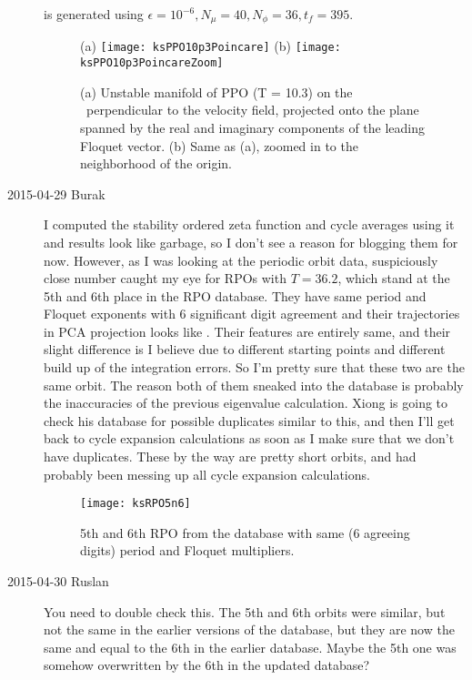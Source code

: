 \begin{description}
 is generated using
$\epsilon = 10^{-6}, N_\mu = 40, N_\phi = 36, t_f = 395$.


\begin{figure}[ht]
\begin{center}
    (a) \texttt{[image: ksPPO10p3Poincare]}
    (b) \texttt{[image: ksPPO10p3PoincareZoom]}
\end{center}
    \caption[]{
        (a) Unstable manifold of PPO (T = 10.3) on the \PoincSec\
        perpendicular to the velocity field, projected onto the plane
        spanned by the real and imaginary components of the leading Floquet
        vector. (b) Same as (a), zoomed in to the neighborhood of the origin.
    }
    \label{f-ppo10p3UnstMan}
\end{figure}

\item[2015-04-29 Burak] I computed the stability ordered zeta function
and cycle averages using it and results look like garbage, so I don't
see a reason for blogging them for now. However, as I was looking at
the periodic orbit data, suspiciously close number caught my eye for
RPOs with $T=36.2$, which stand at the 5th and 6th place in the RPO
database. They have same period and Floquet exponents with 6 significant
digit agreement and their trajectories in PCA projection looks like
\reffig{f-ksRPO5n6}. Their features are entirely same, and their slight
difference is I believe due to different starting points and different
build up of the integration errors. So I'm pretty sure that these two
are the same orbit. The reason both of them sneaked into the database
is probably the inaccuracies of the previous eigenvalue calculation.
Xiong is going to check his database for possible duplicates similar to
this, and then I'll get back to cycle expansion calculations as soon as
I make sure that we don't have duplicates. These by the way are pretty
short orbits, and had probably been messing up all cycle expansion
calculations.

\begin{figure}[ht]
\begin{center}
    \texttt{[image: ksRPO5n6]}
\end{center}
    \caption[]{
      5th and 6th RPO from the database with same (6 agreeing digits)
      period and Floquet multipliers.
    }
    \label{f-ksRPO5n6}
\end{figure}

\item[2015-04-30 Ruslan] You need to double check this.  The 5th and
6th orbits were similar, but not the same in the earlier versions of
the database, but they are now the same and equal to the 6th in the
earlier database.  Maybe the 5th one was somehow overwritten by the
6th in the updated database?


\end{description}
